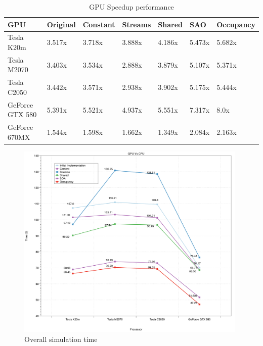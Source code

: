   \begin{table}[h]
\centering
  \begin{tabular} { |  l  |  l | l  |  l  | l | l | l |}
    \hline
    GPU & Original & Constant & Streams & Shared & SAO & Occupancy\\
    \hline
    Tesla K20m & 3.517x & 3.718x & 3.888x & 4.186x & 5.473x & 5.682x\\
   \hline
    Tesla M2070 & 3.403x & 3.534x & 2.888x & 3.879x & 5.107x & 5.371x\\
    \hline
    Tesla C2050 & 3.442x & 3.571x & 2.938x & 3.902x & 5.175x & 5.444x\\
   \hline
    GeForce GTX 580 & 5.391x & 5.521x & 4.937x & 5.551x & 7.317x & 8.0x\\
   \hline
    GeForce 670MX & 1.544x & 1.598x & 1.662x & 1.349x & 2.084x & 2.163x\\
   \hline
  \end{tabular}
    \caption{GPU Speedup performance}
  \label{tab:speed}
  \end{table}

\begin{figure}[htbp]
	\centering
		\includegraphics[width=0.98\textwidth]{Figures/gpuOptimization.png}
		\smallskip
	\caption[Overall simulation time]{Overall simulation time}
	\label{fig:gpuop}
\end{figure}


